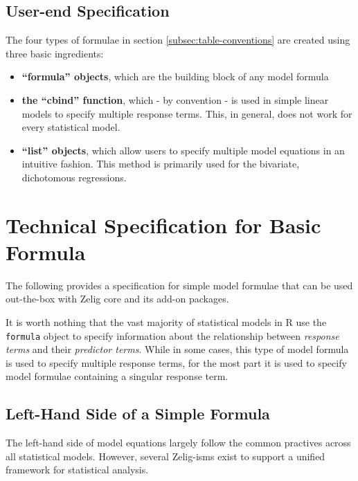 \documentclass{article}
\begin{document}
\subsection{User-end Specification}
\label{subsec:user-spec-formula}

The four types of formulae in section \ref{subsec:table-conventions} are created
using three basic ingredients:

\begin{itemize}

  \item {\bf ``formula'' objects}, which are the building block of any model
    formula

  \item {\bf the ``cbind'' function}, which - by convention - is used in simple
    linear models to specify multiple response terms. This, in general, does not
    work for every statistical model.

  \item {\bf ``list'' objects}, which allow users to specify multiple
    model equations in an intuitive fashion. This method is primarily used for
    the bivariate, dichotomous regressions.

\end{itemize}


\pagebreak


%
%
%
\section{Technical Specification for Basic Formula}

The following provides a specification for simple model formulae that can be
used out-the-box with Zelig core and its add-on packages.

It is worth nothing that the vast majority of statistical models in R use the
\verb|formula| object to specify information about the relationship between
\emph{response terms} and their \emph{predictor terms}. While in some cases,
this type of model formula is used to specify multiple response terms, for the
most part it is used to specify model formulae containing a singular response
term.


\subsection{Left-Hand Side of a Simple Formula}
\label{subsec:lhs}

The left-hand side of model equations largely follow the common practives
across all statistical models. However, several Zelig-isms exist to support
a unified framework for statistical analysis.
\end{document}
